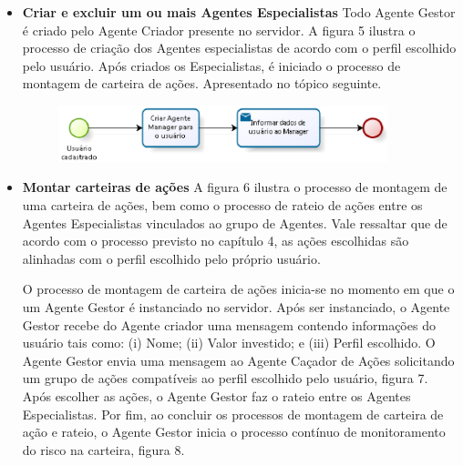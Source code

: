 \begin{apendicesenv}
\begin{itemize}

	\item \textbf{Criar e excluir um ou mais Agentes Especialistas}\newline\newline
	Todo Agente Gestor é criado pelo Agente Criador presente no servidor. A figura 5 ilustra o processo de criação dos Agentes especialistas de acordo com o perfil escolhido pelo usuário. Após criados os Especialistas, é iniciado o processo de montagem de carteira de ações. Apresentado no tópico seguinte.
\begin{figure}[h]
\centering
\label{f5}
\includegraphics[width=0.9\textwidth]{figuras/f29}

\end{figure}

	\item \textbf{Montar carteiras de ações}\newline\newline
	A figura 6 ilustra o processo de montagem de uma carteira de ações, bem como o processo de rateio de ações entre os Agentes Especialistas vinculados ao grupo de Agentes. Vale ressaltar que de acordo com o processo previsto no capítulo 4, as ações escolhidas são alinhadas com o perfil escolhido pelo próprio usuário.  \newline
	
	O processo de montagem de carteira de ações inicia-se no momento em que o um Agente Gestor é instanciado no servidor. Após ser instanciado, o Agente Gestor recebe do Agente criador uma mensagem contendo informações do usuário tais como: (i) Nome; (ii) Valor investido; e (iii) Perfil escolhido. O Agente Gestor envia uma mensagem ao Agente Caçador de Ações solicitando um grupo de ações compatíveis ao perfil escolhido pelo usuário, figura 7. Após escolher as ações, o Agente Gestor faz o rateio entre os Agentes Especialistas. Por fim, ao concluir os processos de montagem de carteira de ação e rateio, o Agente Gestor inicia o processo contínuo de monitoramento do risco na carteira, figura 8.




\end{itemize}
\end{apendicesenv}
